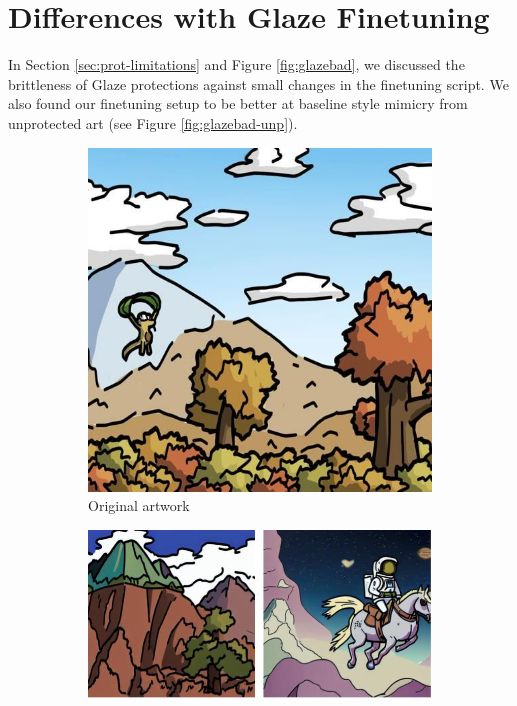 \documentclass{article}
\begin{document}
\section{Differences with Glaze Finetuning}
\label{sec:glazebad-unp}
In Section \ref{sec:prot-limitations} and Figure \ref{fig:glazebad}, we discussed the brittleness of Glaze protections against small changes in the finetuning script. We also found our finetuning setup to be better at baseline style mimicry from unprotected art (see Figure \ref{fig:glazebad-unp}).

\begin{figure}[h]
\centering
\begin{subfigure}[b]{0.19\textwidth}
         \centering
         \includegraphics[width=\textwidth]{plots/process/original/0009.jpg}
         \caption{Original artwork}
     \end{subfigure}
     \hfill
     \begin{subfigure}[b]{0.39\textwidth}
         \centering
         \includegraphics[width=\textwidth]{plots/theirs-unp.jpg}

\end{subfigure}
\end{figure}
\end{document}
